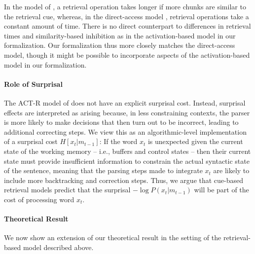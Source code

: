 \documentclass[11pt,letterpaper]{article}
\begin{document}
In the model of \cite{lewis-activation-based-2005}, a retrieval operation takes longer if more chunks are similar to the retrieval cue, whereas, in the direct-access model \citep{mcelree2000sentence,nicenboim2018models,vasishth2019computational}, retrieval operations take a constant amount of time.
There is no direct counterpart to differences in retrieval times and similarity-based inhibition as in the activation-based model in our formalization.
Our formalization thus more closely matches the direct-access model, though it might be possible to incorporate aspects of the activation-based model in our formalization.

\paragraph{Role of Surprisal}
The ACT-R model of \cite{lewis-activation-based-2005} does not have an explicit surprisal cost.
Instead, surprisal effects are interpreted as arising because, in less constraining contexts, the parser is more likely to make decisions that then turn out to be incorrect, leading to additional correcting steps.
We view this as an algorithmic-level implementation of a surprisal cost $H[x_t|m_{t-1}]$:
If the word $x_t$ is unexpected given the current state of the working memory -- i.e., buffers and control states -- then their current state must provide insufficient information to constrain the actual syntactic state of the sentence, meaning that the parsing steps made to integrate $x_t$ are likely to include more backtracking and correction steps.
Thus, we argue that cue-based retrieval models predict that the surprisal $- \log P(x_t|m_{t-1})$ will be part of the cost of processing word $x_t$.



\paragraph{Theoretical Result}
We now show an extension of our theoretical result in the setting of the retrieval-based model described above.
\end{document}
